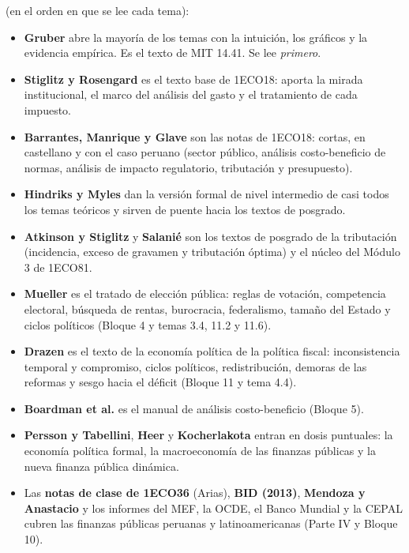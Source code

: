 \documentclass[11pt,a4paper]{article}
\newcommand{\destacado}[1]{{\sffamily\bfseries\color{tonoPrincipal}#1}}
\begin{document}
\medskip
\noindent\destacado{Criterio general de reparto} (en el orden en que se lee cada tema):
\begin{itemize}[leftmargin=1.4em,itemsep=2pt]
  \item \textcolor{colorGR}{\textbf{Gruber}} abre la mayoría de los temas con
        la intuición, los gráficos y la evidencia empírica. Es el texto de
        MIT 14.41. Se lee \emph{primero}.
  \item \textcolor{colorSR}{\textbf{Stiglitz y Rosengard}} es el texto base de
        1ECO18: aporta la mirada institucional, el marco del análisis del
        gasto y el tratamiento de cada impuesto.
  \item \textcolor{colorBG}{\textbf{Barrantes, Manrique y Glave}} son las notas
        de 1ECO18: cortas, en castellano y con el caso peruano (sector
        público, análisis costo-beneficio de normas, análisis de impacto
        regulatorio, tributación y presupuesto).
  \item \textcolor{colorHM}{\textbf{Hindriks y Myles}} dan la versión formal de
        nivel intermedio de casi todos los temas teóricos y sirven de puente
        hacia los textos de posgrado.
  \item \textcolor{colorAS}{\textbf{Atkinson y Stiglitz}} y
        \textcolor{colorSA}{\textbf{Salanié}} son los textos de posgrado de la
        tributación (incidencia, exceso de gravamen y tributación óptima) y el
        núcleo del Módulo 3 de 1ECO81.
  \item \textcolor{colorMU}{\textbf{Mueller}} es el tratado de elección
        pública: reglas de votación, competencia electoral, búsqueda de
        rentas, burocracia, federalismo, tamaño del Estado y ciclos políticos
        (Bloque 4 y temas 3.4, 11.2 y 11.6).
  \item \textcolor{colorDR}{\textbf{Drazen}} es el texto de la economía
        política de la política fiscal: inconsistencia temporal y compromiso,
        ciclos políticos, redistribución, demoras de las reformas y sesgo hacia
        el déficit (Bloque 11 y tema 4.4).
  \item \textcolor{colorBO}{\textbf{Boardman et al.}} es el manual de análisis
        costo-beneficio (Bloque 5).
  \item \textcolor{colorPT}{\textbf{Persson y Tabellini}},
        \textcolor{colorHE}{\textbf{Heer}} y
        \textcolor{colorKC}{\textbf{Kocherlakota}} entran en dosis puntuales:
        la economía política formal, la macroeconomía de las finanzas
        públicas y la nueva finanza pública dinámica.
  \item Las \textcolor{colorPUCP}{\textbf{notas de clase de 1ECO36}}
        (Arias), \textcolor{colorRB}{\textbf{BID (2013)}},
        \textcolor{colorMA}{\textbf{Mendoza y Anastacio}} y los informes del
        MEF, la OCDE, el Banco Mundial y la CEPAL cubren las finanzas
        públicas peruanas y latinoamericanas (Parte IV y Bloque 10).
\end{itemize}
\end{document}

